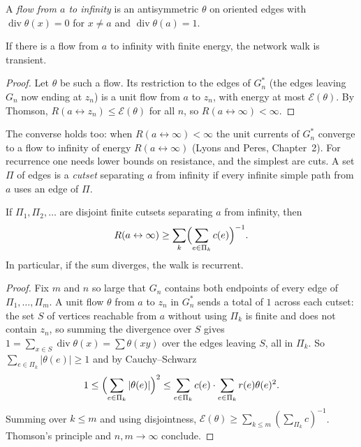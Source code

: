 A \emph{flow from $a$ to infinity} is an antisymmetric $\theta$ on oriented edges with $\operatorname{div}\theta(x)=0$ for $x\ne a$ and $\operatorname{div}\theta(a)=1$.

\begin{theorem}[T.~Lyons, 1983]\label{thm:lyons}
If there is a flow from $a$ to infinity with finite energy, the network walk is transient.
\end{theorem}

\begin{proof}
Let $\theta$ be such a flow. Its restriction to the edges of $G_n^*$ (the edges leaving $G_n$ now ending at $z_n$) is a unit flow from $a$ to $z_n$, with energy at most $\mathcal E(\theta)$. By Thomson,
$R(a\leftrightarrow z_n)\le\mathcal E(\theta)$ for all $n$, so $R(a\leftrightarrow\infty)<\infty$.
\end{proof}

The converse holds too: when $R(a\leftrightarrow\infty)<\infty$ the unit currents of $G_n^*$ converge to a flow to infinity of energy $R(a\leftrightarrow\infty)$ (Lyons and Peres, Chapter~2). For recurrence one needs lower bounds on
resistance, and the simplest are cuts. A set $\Pi$ of edges is a \emph{cutset} separating $a$ from infinity if every infinite simple path from $a$ uses an edge of $\Pi$.

\begin{theorem}\label{thm:nashwilliams}
If $\Pi_1,\Pi_2,\dots$ are disjoint finite cutsets separating $a$ from infinity, then
\[
R(a\leftrightarrow\infty)\ge\sum_k\Bigl(\sum_{e\in\Pi_k}c(e)\Bigr)^{-1}.
\]
In particular, if the sum diverges, the walk is recurrent.
\end{theorem}

\begin{proof}
Fix $m$ and $n$ so large that $G_n$ contains both endpoints of every edge of $\Pi_1,\dots,\Pi_m$. A unit flow $\theta$ from $a$ to $z_n$ in $G_n^*$ sends a total of $1$ across each cutset: the set $S$ of vertices reachable from $a$
without using $\Pi_k$ is finite and does not contain $z_n$, so summing the divergence over $S$ gives $1=\sum_{x\in S}\operatorname{div}\theta(x)=\sum\theta(xy)$ over the edges leaving $S$, all in $\Pi_k$. So
$\sum_{e\in\Pi_k}|\theta(e)|\ge1$ and by Cauchy--Schwarz
\[
1\le\Bigl(\sum_{e\in\Pi_k}|\theta(e)|\Bigr)^2\le\sum_{e\in\Pi_k}c(e)\cdot\sum_{e\in\Pi_k}r(e)\theta(e)^2 .
\]
Summing over $k\le m$ and using disjointness, $\mathcal E(\theta)\ge\sum_{k\le m}(\sum_{\Pi_k}c)^{-1}$. Thomson's principle and $n,m\to\infty$ conclude.
\end{proof}

